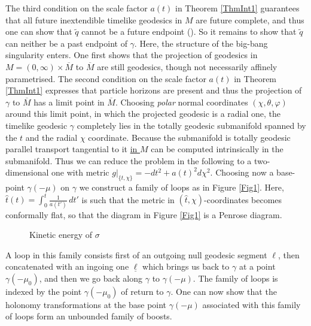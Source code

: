 \documentclass[reqno]{article}
\begin{document}
The third condition on the scale factor $a(t)$ in Theorem \ref{ThmInt1} guarantees that all future inextendible timelike geodesics in $M$ are future complete, and thus one can show that $\tilde{q}$ cannot be a future endpoint (\cite{GalLinSbi17}). So it remains to show that   $\tilde{q}$ can neither be a past endpoint of $\gamma$. Here, the structure of the big-bang singularity enters. One first shows that the projection of geodesics in $M = (0, \infty) \times \overline{M}$  to $\overline{M}$ are still geodesics, though not necessarily affinely parametrised. The second condition on the scale factor $a(t)$ in Theorem \ref{ThmInt1} expresses that particle horizons are present and thus the projection of $\gamma$ to $\overline{M}$ has a limit point in $\overline{M}$. Choosing \emph{polar} normal coordinates $(\chi, \theta, \varphi)$ around this limit point, in which the projected geodesic is a radial one, the timelike geodesic $\gamma$ completely lies in the totally geodesic submanifold spanned by the $t$ and the radial $\chi$ coordinate. Because the submanifold is totally geodesic parallel transport tangential to it \underline{in $M$} can be computed intrinsically in the submanifold. Thus we can reduce the problem in the following to a two-dimensional one with metric $g|_{\{t, \chi\}} = -dt^2 + a(t)^2 d\chi^2$. Choosing now a base-point $\gamma(-\mu)$ on $\gamma$  we construct a family of loops as in Figure \ref{Fig1}. Here, $\hat{t} (t) = \int_0^t \frac{1}{a(t')} \, dt'$ is such that the metric in $(\hat{t}, \chi)$-coordinates becomes conformally flat, so that the diagram in Figure \ref{Fig1} is a Penrose diagram.
\begin{figure}[h]
\centering
\begin{minipage}{.33\textwidth}
  \centering
 \def\svgwidth{5cm}
   
      \caption{Family of loops} \label{Fig1}
\end{minipage}%
\begin{minipage}{.33\textwidth}
  \centering
 \def\svgwidth{5cm}
   
      \caption{Energy of radiation} \label{Fig2}
\end{minipage}%
\begin{minipage}{.33\textwidth}
  \centering
  \def\svgwidth{5cm}
  
     \caption{Kinetic energy of  $\sigma$} \label{Fig3}
\end{minipage}
\end{figure}
A loop in this family consists first of an outgoing null geodesic segment $\ell$, then concatenated with an ingoing one $\underline{\ell}$ which brings us back to $\gamma$ at a point $\gamma(-\mu_0)$, and then we go back along $\gamma$ to $\gamma(-\mu)$. The family of loops is indexed by the point $\gamma(-\mu_0)$ of return to $\gamma$. One can now show that the holonomy transformations at the base point $\gamma(-\mu)$ associated with this family of loops form an unbounded family of boosts.
\end{document}
